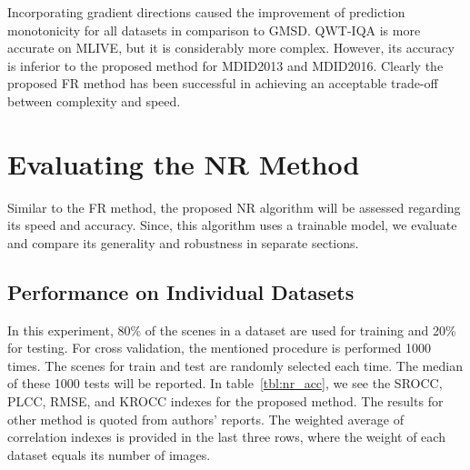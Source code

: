 Incorporating gradient directions caused the improvement of prediction monotonicity for all datasets in comparison to GMSD. QWT-IQA is more accurate on MLIVE, but it is considerably more complex. However, its accuracy is inferior to the proposed method for MDID2013 and MDID2016. Clearly the proposed FR method has been successful in achieving an acceptable trade-off between complexity and speed.
\section{Evaluating the NR Method}
Similar to the FR method, the proposed NR algorithm will be assessed regarding its speed and accuracy. Since, this algorithm uses a trainable model, we evaluate and compare its generality and robustness in separate sections. \subsection{Performance on Individual Datasets}
In this experiment, 80\% of the scenes in a dataset are used for training and 20\% for testing. For cross validation, the mentioned procedure is performed 1000 times. The scenes for train and test are randomly selected each time. The median of these 1000 tests will be reported. In table~\ref{tbl:nr_acc}, we see the SROCC, PLCC, RMSE, and KROCC indexes for the proposed method. The results for other method is quoted from authors' reports. The weighted average of correlation indexes is provided in the last three rows, where the weight of each dataset equals its number of images.

